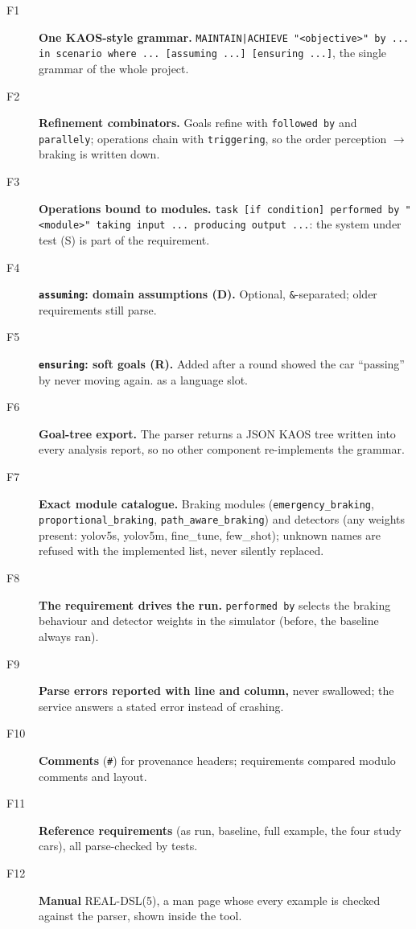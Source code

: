 \begin{description}
\item[F1] \textbf{One KAOS-style grammar.} \texttt{MAINTAIN|ACHIEVE "<objective>" by ... in scenario where ... [assuming ...] [ensuring ...]}, the single grammar of the whole project.  
\item[F2] \textbf{Refinement combinators.} Goals refine with \texttt{followed by} and \texttt{parallely}; operations chain with \texttt{triggering}, so the order perception $\rightarrow$ braking is written down. 
\item[F3] \textbf{Operations bound to modules.} \texttt{task [if condition] performed by "<module>" taking input ... producing output ...}: the system under test (S) is part of the requirement. 
\item[F4] \textbf{\texttt{assuming}: domain assumptions (D).} Optional, \texttt{\&}-separated; older requirements still parse. 
\item[F5] \textbf{\texttt{ensuring}: soft goals (R).} Added after a round showed the car ``passing'' by never moving again.  \tagnew{} as a language slot.
\item[F6] \textbf{Goal-tree export.} The parser returns a JSON KAOS tree written into every analysis report, so no other component re-implements the grammar. \tagnew{} 
\item[F7] \textbf{Exact module catalogue.} Braking modules (\texttt{emergency\_braking}, \texttt{proportional\_braking}, \texttt{path\_aware\_braking}) and detectors (any weights present: yolov5s, yolov5m, fine\_tune, few\_shot); unknown names are refused with the implemented list, never silently replaced. \tagnew{} 
\item[F8] \textbf{The requirement drives the run.} \texttt{performed by} selects the braking behaviour and detector weights in the simulator (before, the baseline always ran).  
\item[F9] \textbf{Parse errors reported with line and column,} never swallowed; the service answers a stated error instead of crashing. \taginfra
\item[F10] \textbf{Comments} (\texttt{\#}) for provenance headers; requirements compared modulo comments and layout. \taginfra
\item[F11] \textbf{Reference requirements} (as run, baseline, full example, the four study cars), all parse-checked by tests. \taginfra
\item[F12] \textbf{Manual} REAL-DSL(5), a man page whose every example is checked against the parser, shown inside the tool. \tagnew{} 
\end{description}

